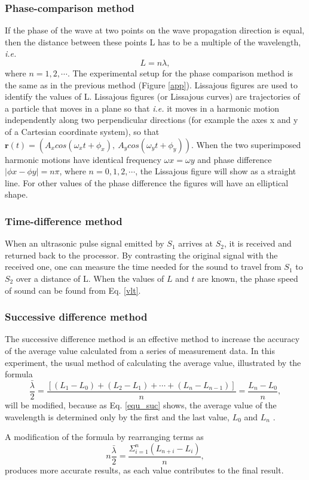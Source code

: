 \subsubsection{Phase-comparison method}

    If the phase of the wave at two points on the wave propagation direction is equal, then the distance between these points L has to be a multiple of the wavelength, \emph{i.e.}
    \[
        L=n\lambda,
    \]
    where $n=1,2,\cdots$. The experimental setup for the phase comparison method is the same as in the previous method (Figure \ref{app}). Lissajous figures are used to identify the values of L. Lissajous figures (or Lissajous curves) are trajectories of a particle that moves in a plane so that \emph{i.e.} it moves in a harmonic motion independently along two perpendicular directions (for example the axes x and y of a Cartesian coordinate system), so that $\textbf{r}(t) = (A_x cos(\omega_x t + \phi_x ),\ A_y cos(\omega_y t + \phi_y ))$. When the two superimposed harmonic motions have identical frequency $\omega x = \omega y$ and phase difference $|\phi x - \phi y | = n\pi$, where $n = 0, 1, 2,\cdots$, the Lissajous figure will show as a straight line. For other values of the phase difference the figures will have an elliptical shape.\\

\subsubsection{Time-difference method}
    When an ultrasonic pulse signal emitted by $S_1$ arrives at $S_2$, it is received and returned back to the processor. By contrasting the original signal with the received one, one can measure the time needed for the sound to travel from $S_1$ to $S_2$ over a distance of L. When the values of $L$ and $t$ are known, the phase speed of sound can be found from Eq. \ref{vlt}.\\
    
\subsubsection{Successive difference method}
    The successive difference method is an effective method to increase the accuracy of the average value calculated from a series of measurement data. In this experiment, the usual method of calculating the average value, illustrated by the formula
    \begin{equation}\label{equ_suc}
        \frac{\bar{\lambda}}{2}=\frac{[(L_1-L_0)+(L_2-L_1)+\cdots+(L_n-L_{n-1})]}{n}=\frac{L_n-L_0}{n},
    \end{equation}
    will be modified, because as Eq. \ref{equ_suc} shows, the average value of the wavelength is determined only by the first and the last value, $L_0$ and $L_n$ .

    A modification of the formula by rearranging terms as
    \begin{equation}\label{equ_suc}
        n\frac{\bar{\lambda}}{2}=\frac{\Sigma_{i=1}^{n}(L_{n+i}-L_i)}{n},
    \end{equation}
    produces more accurate results, as each value contributes to the final result.